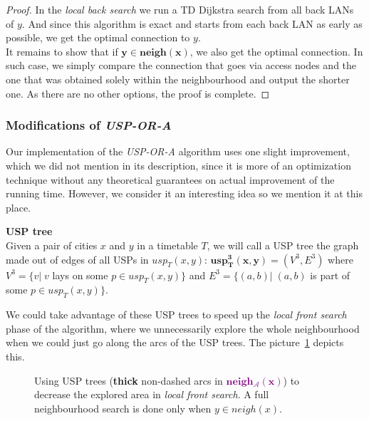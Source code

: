 \begin{proof}
			In the \textit{local back search} we run a TD Dijkstra search from all back LANs of $y$. And since this algorithm is exact and starts from each back LAN as early as possible, we get the optimal connection to $y$. \\
			
			\noindent It remains to show that if $\bm{y \in neigh(x)}$, we also get the optimal connection. In such case, we simply compare the connection that goes via access nodes and the one that was obtained solely within the neighbourhood and output the shorter one. As there are no other options, the proof is complete.
		\end{proof}
	
	\subsubsection{Modifications of \textit{USP-OR-A}}
	
		\noindent Our implementation of the \textit{USP-OR-A} algorithm uses one slight improvement, which we did not mention in its description, since it is more of an optimization technique without any theoretical guarantees on actual improvement of the running time. However, we consider it an interesting idea so we mention it at this place.
		
		\begin{definition}
	        \textbf{USP tree} \\
			Given a pair of cities $x$ and $y$ in a timetable $T$, we will call a USP tree the graph made out of edges of all USPs in $usp_{T}(x, y)$: $\bm{usp^{3}_{T}(x, y)} = (V^{3}, E^{3})$ where $V^{3} = \{v| \; v$ lays on some $p \in usp_{T}(x, y)\}$ and $E^{3} = \{(a, b)| \; (a, b)$ is part of some $p \in usp_{T}(x, y)\}$.
	    \end{definition}
	    
	    \noindent We could take advantage of these USP trees to speed up the \textit{local front search} phase of the algorithm, where we unnecessarily explore the whole neighbourhood when we could just go along the arcs of the USP trees. The picture~\ref{fig:uspora3} depicts this. \\
	    
	    \begin{figure}[h!]
			\begin{center}
			\end{center}
			\caption{\label{fig:uspora3} Using USP trees (\textbf{thick} non-dashed arcs in \textcolor{purple}{$\bm{neigh_{\mathcal{A}}(x)}$}) to decrease the explored area in \textit{local front search}. A full neighbourhood search is done only when $y \in neigh(x)$.}
		\end{figure}
		
